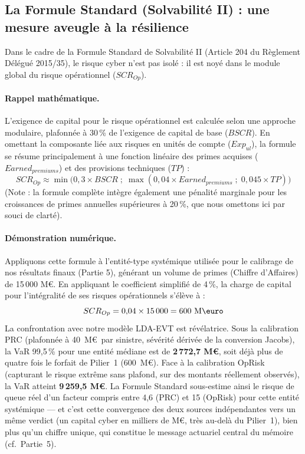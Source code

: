 \documentclass[11pt,a4paper]{article}
\theoremstyle{navystyle}
\theoremstyle{navydef}
\begin{document}
\subsection{La Formule Standard (Solvabilité II) : une mesure aveugle à la résilience}

Dans le cadre de la Formule Standard de Solvabilité II (Article 204 du Règlement Délégué 2015/35), le risque cyber n'est pas isolé : il est noyé dans le module global du risque opérationnel ($SCR_{Op}$).

\paragraph{Rappel mathématique.} L'exigence de capital pour le risque opérationnel est calculée selon une approche modulaire, plafonnée à 30\,\% de l'exigence de capital de base ($BSCR$). En omettant la composante liée aux risques en unités de compte ($Exp_{ul}$), la formule se résume principalement à une fonction linéaire des primes acquises ($Earned_{premiums}$) et des provisions techniques ($TP$) :
\begin{equation}
SCR_{Op} \approx \min\Big( 0{,}3 \times BSCR \; ; \; \max(0{,}04 \times Earned_{premiums} \; ; \; 0{,}045 \times TP) \Big)
\end{equation}
(Note : la formule complète intègre également une pénalité marginale pour les croissances de primes annuelles supérieures à 20\,\%, que nous omettons ici par souci de clarté).

\paragraph{Démonstration numérique.} Appliquons cette formule à l'entité-type systémique utilisée pour le calibrage de nos résultats finaux (Partie 5), générant un volume de primes (Chiffre d'Affaires) de 15\,000 M\euro.
En appliquant le coefficient simplifié de 4\,\%, la charge de capital pour l'intégralité de ses risques opérationnels s'élève à :
\begin{equation}
SCR_{Op} = 0{,}04 \times 15\,000 = 600 \text{ M\euro}
\end{equation}
La confrontation avec notre modèle LDA-EVT est révélatrice. Sous la calibration PRC (plafonnée à 40~M\euro\ par sinistre, sévérité dérivée de la conversion Jacobs), la VaR 99,5\,\% pour une entité médiane est de \textbf{2\,772,7 M\euro}, soit déjà plus de quatre fois le forfait de Pilier~1 (600~M\euro). Face à la calibration OpRisk (capturant le risque extrême sans plafond, sur des montants réellement observés), la VaR atteint \textbf{9\,259,5 M\euro}. La Formule Standard sous-estime ainsi le risque de queue réel d'un facteur compris entre 4{,}6 (PRC) et 15 (OpRisk) pour cette entité systémique --- et c'est cette convergence des deux sources indépendantes vers un même verdict (un capital cyber en milliers de M\euro, très au-delà du Pilier~1), bien plus qu'un chiffre unique, qui constitue le message actuariel central du mémoire (cf.~Partie~5).
\end{document}
